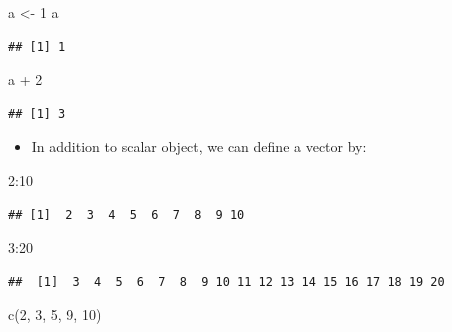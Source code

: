 \documentclass[
]{book}
\newenvironment{Shaded}{\begin{snugshade}}{\end{snugshade}}
\newcommand{\DecValTok}[1]{\textcolor[rgb]{0.00,0.00,0.81}{#1}}
\newcommand{\FunctionTok}[1]{\textcolor[rgb]{0.00,0.00,0.00}{#1}}
\newcommand{\NormalTok}[1]{#1}
\newcommand{\OtherTok}[1]{\textcolor[rgb]{0.56,0.35,0.01}{#1}}
\newcommand{\SpecialCharTok}[1]{\textcolor[rgb]{0.00,0.00,0.00}{#1}}
\providecommand{\tightlist}{%
  \setlength{\itemsep}{0pt}\setlength{\parskip}{0pt}}
\begin{document}
\begin{Shaded}
\begin{Highlighting}[]
\NormalTok{a }\OtherTok{\textless{}{-}} \DecValTok{1}
\NormalTok{a}
\end{Highlighting}
\end{Shaded}

\begin{verbatim}
## [1] 1
\end{verbatim}

\begin{Shaded}
\begin{Highlighting}[]
\NormalTok{a }\SpecialCharTok{+} \DecValTok{2}
\end{Highlighting}
\end{Shaded}

\begin{verbatim}
## [1] 3
\end{verbatim}

\begin{itemize}
\tightlist
\item
  In addition to scalar object, we can define a vector by:
\end{itemize}

\begin{Shaded}
\begin{Highlighting}[]
\DecValTok{2}\SpecialCharTok{:}\DecValTok{10}
\end{Highlighting}
\end{Shaded}

\begin{verbatim}
## [1]  2  3  4  5  6  7  8  9 10
\end{verbatim}

\begin{Shaded}
\begin{Highlighting}[]
\DecValTok{3}\SpecialCharTok{:}\DecValTok{20}
\end{Highlighting}
\end{Shaded}

\begin{verbatim}
##  [1]  3  4  5  6  7  8  9 10 11 12 13 14 15 16 17 18 19 20
\end{verbatim}

\begin{Shaded}
\begin{Highlighting}[]
\FunctionTok{c}\NormalTok{(}\DecValTok{2}\NormalTok{, }\DecValTok{3}\NormalTok{, }\DecValTok{5}\NormalTok{, }\DecValTok{9}\NormalTok{, }\DecValTok{10}\NormalTok{)}
\end{Highlighting}
\end{Shaded}
\end{document}
